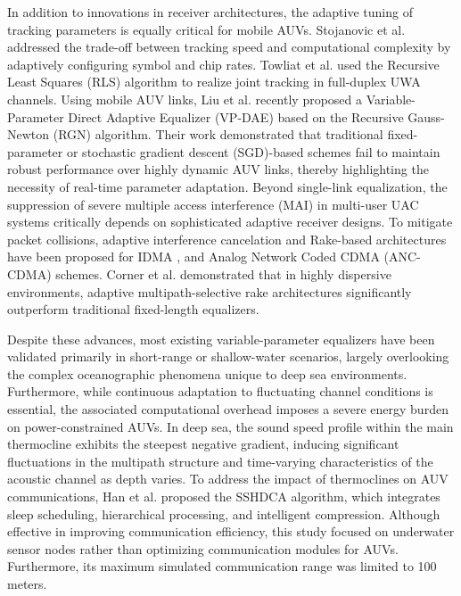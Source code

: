 \documentclass[lettersize,journal]{IEEEtran}
\begin{document}
In addition to innovations in receiver architectures, the adaptive tuning of tracking parameters is equally critical for mobile AUVs. Stojanovic et al. \cite{ref9} addressed the trade-off between tracking speed and computational complexity by adaptively configuring symbol and chip rates. Towliat et al. \cite{ref10} used the Recursive Least Squares (RLS) algorithm to realize joint tracking in full-duplex UWA channels. Using mobile AUV links, Liu et al. \cite{ref11} recently proposed a Variable-Parameter Direct Adaptive Equalizer (VP-DAE) based on the Recursive Gauss-Newton (RGN) algorithm. Their work demonstrated that traditional fixed-parameter or stochastic gradient descent (SGD)-based schemes fail to maintain robust performance over highly dynamic AUV links, thereby highlighting the necessity of real-time parameter adaptation. Beyond single-link equalization, the suppression of severe multiple access interference (MAI) in multi-user UAC systems critically depends on sophisticated adaptive receiver designs. To mitigate packet collisions, adaptive interference cancelation and Rake-based architectures have been proposed for IDMA \cite{ref12}, \cite{ref13} and Analog Network Coded CDMA (ANC-CDMA) \cite{ref14} schemes. Corner et al. \cite{ref15} demonstrated that in highly dispersive environments, adaptive multipath-selective rake architectures significantly outperform traditional fixed-length equalizers.

Despite these advances, most existing variable-parameter equalizers have been validated primarily in short-range or shallow-water scenarios, largely overlooking the complex oceanographic phenomena unique to deep sea environments. Furthermore, while continuous adaptation to fluctuating channel conditions is essential, the associated computational overhead imposes a severe energy burden on power-constrained AUVs. In deep sea, the sound speed profile within the main thermocline exhibits the steepest negative gradient, inducing significant fluctuations in the multipath structure and time-varying characteristics of the acoustic channel as depth varies. To address the impact of thermoclines on AUV communications, Han et al. \cite{ref16} proposed the SSHDCA algorithm, which integrates sleep scheduling, hierarchical processing, and intelligent compression. Although effective in improving communication efficiency, this study focused on underwater sensor nodes rather than optimizing communication modules for AUVs. Furthermore, its maximum simulated communication range was limited to 100 meters.
\end{document}
